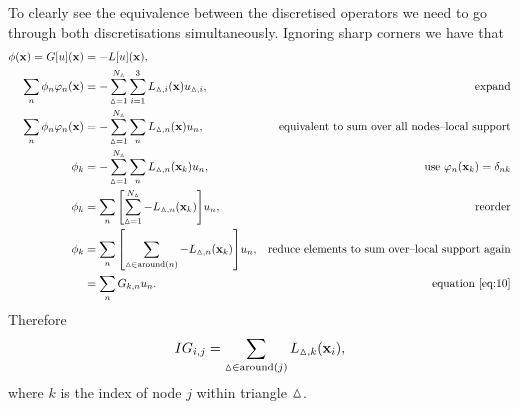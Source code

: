To clearly see the equivalence between the discretised operators we need to go through both discretisations simultaneously.
Ignoring sharp corners we have that
\begin{equation}
  \begin{aligned}
    \phi(\mathbf{x}) = G[u](\mathbf{x}) &= -L[u](\mathbf{x}), \\
    \sum_{n} \phi_n \varphi_n(\mathbf{x}) 
    &= - \sum_{\vartriangle=1}^{N_\vartriangle} \sum_{i=1}^{3} L_{\vartriangle,i}(\mathbf{x}) u_{\vartriangle,i}, 
    \quad\quad&\text{expand}\\
    \sum_{n} \phi_n \varphi_n(\mathbf{x}) 
    &= - \sum_{\vartriangle=1}^{N_\vartriangle} \sum_n L_{\vartriangle,n}(\mathbf{x}) u_n, 
    &\text{equivalent to sum over all nodes--local support}\\
    \phi_k &= - \sum_{\vartriangle=1}^{N_\vartriangle} \sum_n L_{\vartriangle,n}(\mathbf{x}_k) u_n, 
    &\text{use $\varphi_n(\mathbf{x}_k) = \delta_{nk}$}\\
    \phi_k &= \sum_n {\left[ \sum_{\vartriangle=1}^{N_\vartriangle} -L_{\vartriangle,n}(\mathbf{x}_k) \right]} u_n, 
    &\text{reorder}\\
    \phi_k &= \sum_n {\left[ \sum_{\vartriangle \in \text{around}(n)} -L_{\vartriangle,n}(\mathbf{x}_k) \right]} u_n,
    &\text{reduce elements to sum over--local support again}\\
    &= \sum_n G_{k,n} u_n. 
    &\text{equation~\eqref{eq:10}}
  \end{aligned}
\end{equation}
Therefore 
\begin{equation}
  IG_{i,j} = \sum_{\vartriangle \in \text{around}(j)} L_{\vartriangle,k}(\mathbf{x}_i),
\end{equation}
where $k$ is the index of node $j$ within triangle $\vartriangle$.

